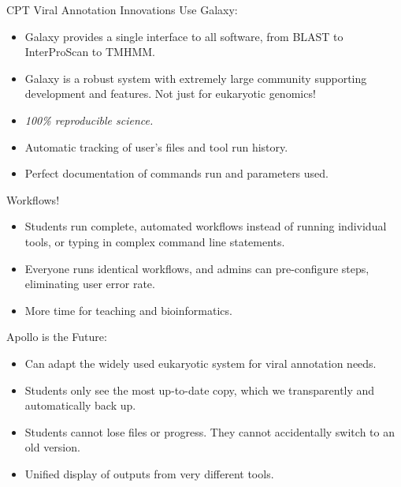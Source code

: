 \documentclass[final,t]{beamer}
\begin{document}
\begin{frame}[fragile]
\begin{columns}[t]
\begin{column}{.36\linewidth}
            \begin{block}{CPT Viral Annotation Innovations}
                Use Galaxy:
                \begin{itemize}
                    \item Galaxy provides a single interface to all software,
                        from BLAST to InterProScan to TMHMM.
                    \item Galaxy is a robust system with extremely large community
                        supporting development and features. Not just for eukaryotic genomics!
                    \item \emph{100\% reproducible science.}
                    \item Automatic tracking of user's files and tool run history.
                    \item Perfect documentation of commands run and parameters used.
                \end{itemize}
                Workflows!
                \begin{itemize}
                    \item Students run complete, automated workflows instead of
                        running individual tools, or typing in complex command
                        line statements.
                    \item Everyone runs identical workflows, and admins can
                        pre-configure steps, eliminating user error rate.
                    \item More time for teaching and bioinformatics.
                \end{itemize}
                Apollo is the Future:
                \begin{itemize}
                    \item Can adapt the widely used eukaryotic system for viral
                        annotation needs.
                    \item Students only see the most up-to-date copy, which we
                        transparently and automatically back up.
                    \item Students cannot lose files or progress. They cannot
                        accidentally switch to an old version.
                    \item Unified display of outputs from very different tools.
                \end{itemize}
            \end{block}


\end{column}
\end{columns}
\end{frame}
\end{document}

